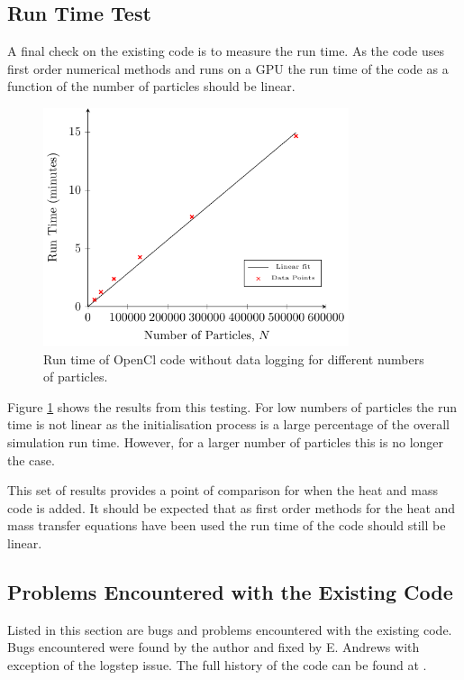 \documentclass[../Interim_Report_Master]{subfiles}
\begin{document}
\subsection{Run Time Test}
A final check on the existing code is to measure the run time. As the code uses first order numerical methods and runs on a GPU the run time of the code as a function of the number of particles should be linear.

\begin{figure}[H]
	\centering
	\includegraphics[width=0.8\textwidth]{./Diagrams/Timing/Oranges_Time_Test.pdf}
	\caption{Run time of OpenCl code without data logging for different numbers of particles.}
	\label{oranges_time_test}
\end{figure}

Figure \ref{oranges_time_test} shows the results from this testing. For low numbers of particles the run time is not linear as the initialisation process is a large percentage of the overall simulation run time. However, for a larger number of particles this is no longer the case. 

This set of results provides a point of comparison for when the heat and mass code is added. It should be expected that as first order methods for the heat and mass transfer equations have been used the run time of the code should still be linear. 

\subsection{Problems Encountered with the Existing Code}
Listed in this section are bugs and problems encountered with the existing code. Bugs encountered were found by the author and fixed by E. Andrews with exception of the logstep issue. The full history of the code can be found at \cite{andrews2020}.
\end{document}

